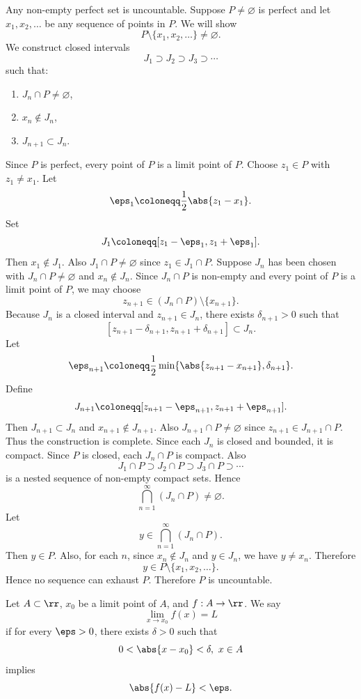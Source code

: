 

\begin{theorem}{
    Any non-empty perfect set is uncountable.
}
    Suppose $P\neq\varnothing$ is perfect and let $x_1,x_2,\ldots$ be any sequence of points in $P$.
    We will show
    \[
        P\setminus\{x_1,x_2,\ldots\}\neq\varnothing.
    \]
    We construct closed intervals
    \[
        J_1 \supset J_2 \supset J_3 \supset \cdots
    \]
    such that:
    \begin{enumerate}
        \item $J_n\cap P\neq\varnothing$,
        \item $x_n\notin J_n$,
        \item $J_{n+1}\subset J_n$.
    \end{enumerate}

    Since $P$ is perfect, every point of $P$ is a limit point of $P$.
    Choose $z_1\in P$ with $z_1\neq x_1$.
    Let
    \[
        \eps_1 \coloneqq \frac{1}{2}\abs{z_1-x_1}.
    \]
    Set
    \[
        J_1 \coloneqq [z_1-\eps_1,z_1+\eps_1].
    \]
    Then $x_1\notin J_1$.
    Also $J_1\cap P\neq\varnothing$ since $z_1\in J_1\cap P$.
    Suppose $J_n$ has been chosen with $J_n\cap P\neq\varnothing$ and $x_n\notin J_n$.
    Since $J_n\cap P$ is non-empty and every point of $P$ is a limit point of $P$, we may choose
    \[
        z_{n+1}\in (J_n\cap P)\setminus\{x_{n+1}\}.
    \]
    Because $J_n$ is a closed interval and $z_{n+1}\in J_n$, there exists $\delta_{n+1}>0$ such that
    \[
        [z_{n+1}-\delta_{n+1},z_{n+1}+\delta_{n+1}] \subset J_n.
    \]
    Let
    \[
        \eps_{n+1} \coloneqq \frac{1}{2}\min\{\abs{z_{n+1}-x_{n+1}},\delta_{n+1}\}.
    \]
    Define
    \[
        J_{n+1} \coloneqq [z_{n+1}-\eps_{n+1},z_{n+1}+\eps_{n+1}].
    \]
    Then $J_{n+1}\subset J_n$ and $x_{n+1}\notin J_{n+1}$.
    Also $J_{n+1}\cap P\neq\varnothing$ since $z_{n+1}\in J_{n+1}\cap P$.
    Thus the construction is complete.
    Since each $J_n$ is closed and bounded, it is compact.
    Since $P$ is closed, each $J_n\cap P$ is compact.
    Also
    \[
        J_1\cap P \supset J_2\cap P \supset J_3\cap P \supset \cdots
    \]
    is a nested sequence of non-empty compact sets.
    Hence
    \[
        \bigcap_{n=1}^\infty (J_n\cap P)\neq\varnothing.
    \]
    Let
    \[
        y\in \bigcap_{n=1}^\infty (J_n\cap P).
    \]
    Then $y\in P$.
    Also, for each $n$, since $x_n\notin J_n$ and $y\in J_n$, we have $y\neq x_n$.
    Therefore
    \[
        y\in P\setminus\{x_1,x_2,\ldots\}.
    \]
    Hence no sequence can exhaust $P$.
    Therefore $P$ is uncountable.
\end{theorem}

\begin{definition}
    Let $A\subset\rr$, $x_0$ be a limit point of $A$, and $f:A\to\rr$.
    We say
    \[
        \lim_{x\to x_0} f(x) = L
    \]
    if for every $\eps > 0$, there exists $\delta > 0$ such that
    \[
        0 < \abs{x-x_0} < \delta,\ x\in A
    \]
    implies
    \[
        \abs{f(x)-L} < \eps.
    \]
\end{definition}